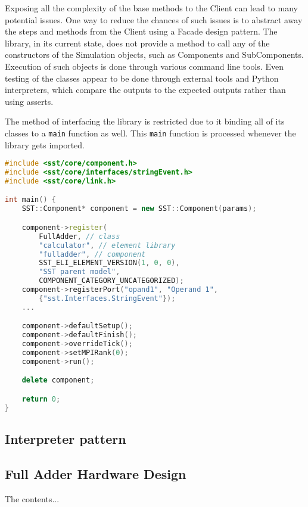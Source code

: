 \documentclass[titlepage]{article}
\begin{document}
Exposing all the complexity of the base methods to the Client can lead to many potential issues. One way to reduce the chances of such issues is to abstract away the steps and methods from the Client using a Facade design pattern. The library, in its current state, does not provide a method to call any of the constructors of the Simulation objects, such as Components and SubComponents. Execution of such objects is done through various command line tools. Even testing of the classes appear to be done through external tools and Python interpreters, which compare the outputs to the expected outputs rather than using asserts.

The method of interfacing the library is restricted due to it binding all of its classes to a \texttt{main} function as well. This \texttt{main} function is processed whenever the library gets imported.

\begin{lstlisting}[language=c++]
#include <sst/core/component.h>
#include <sst/core/interfaces/stringEvent.h>
#include <sst/core/link.h>

int main() {
    SST::Component* component = new SST::Component(params);

    component->register(
        FullAdder, // class
        "calculator", // element library
        "fulladder", // component
        SST_ELI_ELEMENT_VERSION(1, 0, 0),
        "SST parent model",
        COMPONENT_CATEGORY_UNCATEGORIZED);
    component->registerPort("opand1", "Operand 1", 
        {"sst.Interfaces.StringEvent"});
    ...

    component->defaultSetup();
    component->defaultFinish();
    component->overrideTick();
    component->setMPIRank(0);
    component->run();

    delete component;

    return 0;
}
\end{lstlisting}

\subsection{Interpreter pattern}

\begin{appendices}
    \section{Full Adder Hardware Design}
    The contents...
\end{appendices}



\end{document}
